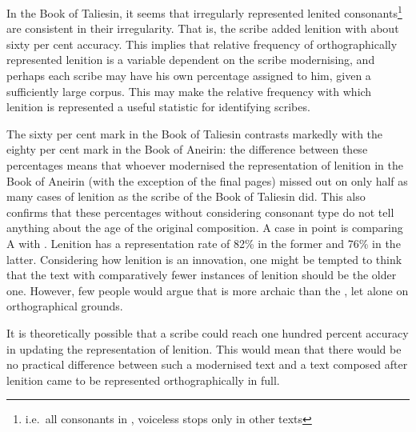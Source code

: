 In the Book of Taliesin, it seems that irregularly represented lenited consonants\footnote{i.e.\ all consonants in , voiceless stops only in other texts} are consistent in their irregularity. That is, the scribe added lenition with about sixty per cent accuracy. This implies that  relative frequency of orthographically represented lenition is a variable dependent on the scribe modernising, and perhaps each scribe may have his own percentage assigned to him, given a sufficiently large corpus. This may make the relative frequency with which lenition is represented a useful statistic for identifying scribes. 

The sixty per cent mark in the Book of Taliesin contrasts markedly with the eighty per cent mark in the Book of Aneirin: the difference between these percentages means that whoever modernised the representation of lenition in the Book of Aneirin (with the exception of the final pages) missed out on only half as many cases of lenition as the scribe of the Book of Taliesin did. This also confirms that these percentages without considering consonant type do not tell anything about the age of the original composition. A case in point is comparing  A with . Lenition has a representation rate of 82\% in the former and 76\% in the latter. Considering how lenition is an innovation, one might be tempted to think that the text with comparatively fewer instances of lenition should be the older one. However, few people would argue that  is more archaic than the , let alone on orthographical grounds.

It is theoretically possible that a scribe could reach one hundred percent accuracy in updating the representation of lenition. This would mean that there would be no practical difference between such a modernised text and a text composed after lenition came to be represented orthographically in full.